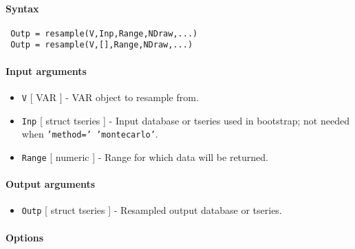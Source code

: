 


	\paragraph{Syntax}
 
 \begin{verbatim}
 Outp = resample(V,Inp,Range,NDraw,...)
 Outp = resample(V,[],Range,NDraw,...)
 \end{verbatim}
 
 \paragraph{Input arguments}
 
 \begin{itemize}
 \item
   \texttt{V} {[} VAR {]} - VAR object to resample from.
 \item
   \texttt{Inp} {[} struct \textbar{} tseries {]} - Input database or
   tseries used in bootstrap; not needed when
   \texttt{'method=' 'montecarlo'}.
 \item
   \texttt{Range} {[} numeric {]} - Range for which data will be
   returned.
 \end{itemize}
 
 \paragraph{Output arguments}
 
 \begin{itemize}
 \item
   \texttt{Outp} {[} struct \textbar{} tseries {]} - Resampled output
   database or tseries.
 \end{itemize}
 
 \paragraph{Options}
 
